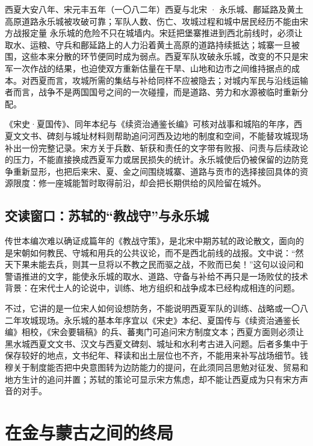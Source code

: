 \begin{event}{}{西夏大安八年、宋元丰五年（一〇八二年）}{西夏与北宋 · 永乐城、鄜延路及黄土高原道路}{永乐城被攻破可靠；军队人数、伤亡、攻城过程和城中居民经历不能由宋方战报定量}
永乐城的危险不只在城墙内。宋廷把堡寨推进到西北前线时，必须让取水、运粮、守兵和鄜延路上的人力沿着黄土高原的道路持续抵达；城寨一旦被围，这些本来分散的环节便同时成为弱点。西夏军队攻破永乐城，改变的不只是宋军一次作战的结果，也迫使双方重新估量在干旱、山地和边市之间维持据点的成本。对西夏而言，攻城所需的集结与补给同样不应被隐去；对城内军民与沿线运输者而言，战争不是两国国号之间的一次碰撞，而是道路、劳力和水源被临时重新分配。

《宋史·夏国传》、同年本纪与《续资治通鉴长编》可核对战事和城陷的年序，西夏文文书、碑刻与城址材料则帮助追问河西及边地的制度和空间，不能替攻城现场补出一份完整记录。宋方关于兵数、斩获和责任的文字带有败报、问责与后续政论的压力，不能直接换成西夏军力或居民损失的统计。永乐城使后仍被保留的边防竞争重新显形，也把后来宋、夏、金之间围绕城寨、道路与贡市的选择接回具体的资源限度：修一座城能暂时取得前沿，却会把长期供给的风险留在城外。
\end{event}

\subsection{交读窗口：苏轼的“教战守”与永乐城}

传世本编次难以确证成篇年的《教战守策》，是北宋中期苏轼的政论散文，面向的是宋朝如何教民、守城和用兵的公共议论，而不是西北前线的战报。文中说：“然天下果未能去兵，则其一旦将以不教之民而驱之战，不败而已矣！”这句以设问和警语推进的文字，能使永乐城的取水、道路、守备与补给不再只是一场败仗的技术背景：在宋代士人的论说中，训练、地方组织和战争成本已经构成相连的问题。

不过，它讲的是一位宋人如何设想防务，不能说明西夏军队的训练、战略或一〇八二年攻城现场。永乐城的基本年序宜以《宋史》本纪、夏国传与《续资治通鉴长编》相校，《宋会要辑稿》的兵、蕃夷门可追问宋方制度文本；西夏方面则必须让黑水城西夏文文书、汉文与西夏文碑刻、城址和水利考古进入问题。后者多集中于保存较好的地点，文书纪年、释读和出土层位也不齐，不能用来补写战场细节。钱穆关于制度能否把中央意图转为边防能力的提问，在此须同吕思勉对征发、贸易和地方生计的追问并置；苏轼的策论可显示宋方焦虑，却不能让西夏成为只有宋方声音的对手。

\section{在金与蒙古之间的终局}

